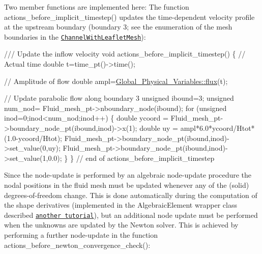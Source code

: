 Two member functions are implemented here\+: The function {\ttfamily actions\+\_\+before\+\_\+implicit\+\_\+timestep()} updates the time-\/dependent velocity profile at the upstream boundary (boundary 3; see the enumeration of the mesh boundaries in the \href{../../../meshes/mesh_list/html/index.html#channel_with_leaflet}{\tt {\ttfamily Channel\+With\+Leaflet\+Mesh}})\+: 
\begin{DoxyCodeInclude}

\textcolor{comment}{}
\textcolor{comment}{/// Update the inflow velocity}
\textcolor{comment}{} \textcolor{keywordtype}{void} actions\_before\_implicit\_timestep()
  \{
   \textcolor{comment}{// Actual time}
   \textcolor{keywordtype}{double} t=time\_pt()->time();

   \textcolor{comment}{// Amplitude of flow}
   \textcolor{keywordtype}{double} ampl=\hyperlink{namespaceGlobal__Physical__Variables_ad651484fe06209606bccefe6fe23be0c}{Global\_Physical\_Variables::flux}(t);

   \textcolor{comment}{// Update parabolic flow along boundary 3}
   \textcolor{keywordtype}{unsigned} ibound=3; 
   \textcolor{keywordtype}{unsigned} num\_nod= Fluid\_mesh\_pt->nboundary\_node(ibound);
   \textcolor{keywordflow}{for} (\textcolor{keywordtype}{unsigned} inod=0;inod<num\_nod;inod++)
   \{
    \textcolor{keywordtype}{double} ycoord = Fluid\_mesh\_pt->boundary\_node\_pt(ibound,inod)->x(1); 
    \textcolor{keywordtype}{double} uy = ampl*6.0*ycoord/Htot*(1.0-ycoord/Htot);
    Fluid\_mesh\_pt->boundary\_node\_pt(ibound,inod)->set\_value(0,uy);
    Fluid\_mesh\_pt->boundary\_node\_pt(ibound,inod)->set\_value(1,0.0);    
   \}
  \} \textcolor{comment}{// end of actions\_before\_implicit\_timestep}

\end{DoxyCodeInclude}


Since the node-\/update is performed by an algebraic node-\/update procedure the nodal positions in the fluid mesh must be updated whenever any of the (solid) degrees-\/of-\/freedom change. This is done automatically during the computation of the shape derivatives (implemented in the {\ttfamily Algebraic\+Element} wrapper class described \href{../../fsi_collapsible_channel_algebraic/html/index.html}{\tt another tutorial}), but an additional node update must be performed when the unknowns are updated by the Newton solver. This is achieved by performing a further node-\/update in the function {\ttfamily actions\+\_\+before\+\_\+newton\+\_\+convergence\+\_\+check()}\+:


